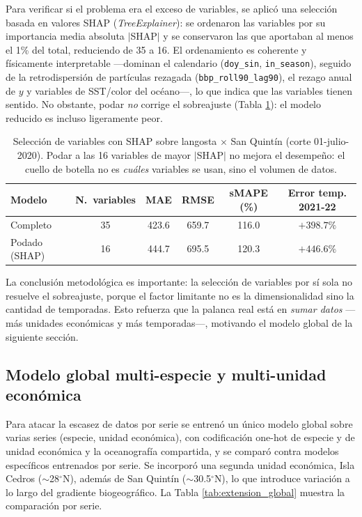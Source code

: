 Para verificar si el problema era el exceso de variables, se aplicó una selección basada en valores SHAP \cite{lundberg2017} (\emph{TreeExplainer}): se ordenaron las variables por su importancia media absoluta $|$SHAP$|$ y se conservaron las que aportaban al menos el 1\% del total, reduciendo de 35 a 16. El ordenamiento es coherente y físicamente interpretable ---dominan el calendario (\texttt{doy\_sin}, \texttt{in\_season}), seguido de la retrodispersión de partículas rezagada (\texttt{bbp\_roll90\_lag90}), el rezago anual de $y$ y variables de SST/color del océano---, lo que indica que las variables tienen sentido. No obstante, podar \emph{no} corrige el sobreajuste (Tabla \ref{tab:extension_shap}): el modelo reducido es incluso ligeramente peor.

\begin{table}[htbp]
\centering
\begin{tabular}{lccccc}
\toprule
Modelo & N.\ variables & MAE & RMSE & sMAPE (\%) & Error temp. 2021-22 \\
\midrule
Completo & 35 & 423.6 & 659.7 & 116.0 & $+398.7\%$ \\
Podado (SHAP) & 16 & 444.7 & 695.5 & 120.3 & $+446.6\%$ \\
\bottomrule
\end{tabular}
\caption{Selección de variables con SHAP sobre langosta $\times$ San Quintín (corte 01-julio-2020). Podar a las 16 variables de mayor $|$SHAP$|$ no mejora el desempeño: el cuello de botella no es \emph{cuáles} variables se usan, sino el volumen de datos.}
\label{tab:extension_shap}
\end{table}

La conclusión metodológica es importante: la selección de variables por sí sola no resuelve el sobreajuste, porque el factor limitante no es la dimensionalidad sino la cantidad de temporadas. Esto refuerza que la palanca real está en \emph{sumar datos} ---más unidades económicas y más temporadas---, motivando el modelo global de la siguiente sección.

\subsection{Modelo global multi-especie y multi-unidad económica}
Para atacar la escasez de datos por serie se entrenó un único modelo global sobre varias series (especie, unidad económica), con codificación one-hot de especie y de unidad económica y la oceanografía compartida, y se comparó contra modelos específicos entrenados por serie. Se incorporó una segunda unidad económica, Isla Cedros ($\sim$28$^\circ$N), además de San Quintín ($\sim$30.5$^\circ$N), lo que introduce variación a lo largo del gradiente biogeográfico. La Tabla \ref{tab:extension_global} muestra la comparación por serie.

